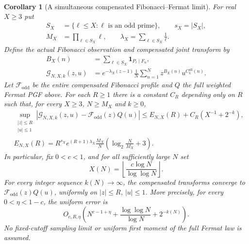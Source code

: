 \documentclass[11pt]{article}
\newtheorem{corollary}[theorem]{Corollary}
\theoremstyle{definition}
\begin{document}
\begin{corollary}[A simultaneous compensated Fibonacci--Fermat limit]
\label{cor:diagonal-fibonacci-fermat}
For real $X\ge3$ put
\begin{align*}
 S_X&=\{\ell\le X:\ell\text{ is an odd prime}\},\qquad s_X=|S_X|,\\
 M_X&=\prod_{\ell\in S_X}\ell,\qquad
 \lambda_X=\sum_{\ell\in S_X}\frac1\ell.
\end{align*}
Define the actual Fibonacci observation and compensated joint transform by
\begin{align*}
 B_X(n)&=\sum_{\ell\in S_X}\boldsymbol1_{P_\ell\mid F_n},\\
 \mathcal G_{N,X,k}(z,u)
 &=e^{-\lambda_X(z-1)}
   \frac1N\sum_{n=1}^N z^{B_X(n)}u^{C_k^{\mathrm{all}}(n)}.
\end{align*}
Let $\mathcal F_{\mathrm{odd}}$ be the entire compensated Fibonacci
profile and $Q$ the full weighted Fermat PGF above.
For each $R\ge1$ there is a constant $C_R$ depending only on $R$
such that, for every $X\ge3$, $N\ge M_X$ and $k\ge0$,
\begin{align*}
 &\sup_{\substack{|z|\le R\\|u|\le1}}
 \left|\mathcal G_{N,X,k}(z,u)-\mathcal F_{\mathrm{odd}}(z)Q(u)\right|
 \le E_{N,X}(R)+C_R(X^{-1}+2^{-k}),\\
 &E_{N,X}(R)=R^{s_X}e^{(R+1)\lambda_X}
       \frac{M_X}{N}\left(\log_2\frac{N}{M_X}+3\right).
\end{align*}
In particular, fix $0<c<1$, and for all sufficiently large $N$ set
\[
 X(N)=\left\lfloor\frac{c\log N}{\log\log N}\right\rfloor.
\]
For every integer sequence $k(N)\to\infty$, the compensated transforms
converge to $\mathcal F_{\mathrm{odd}}(z)Q(u)$, uniformly on
$|z|\le R$, $|u|\le1$.  More precisely, for every $0<\eta<1-c$,
the uniform error is
\[
 O_{c,R,\eta}\left(
 N^{c-1+\eta}+\frac{\log\log N}{\log N}+2^{-k(N)}
 \right).
\]
No fixed-cutoff sampling limit or uniform first moment of the full
Fermat law is assumed.
\end{corollary}
\end{document}
